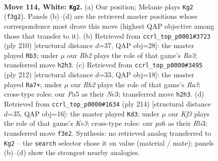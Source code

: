 \documentclass[11pt]{article}
\begin{document}
\clearpage

\begin{figure}[p]\centering
\begin{subfigure}{0.46\textwidth}\centering
\resizebox{\linewidth}{!}{%
\newchessgame
\chessboard[
  setfen={8/k7/p5r1/P1p2p1p/1p3P1P/1P2PKP1/7R/8 w - - 15 114},
  showmover=false,
  pgfstyle=straightmove, color=movearrow, markmove={f3-g2}
]}
\caption{}
\end{subfigure}\hfill
\begin{subfigure}{0.46\textwidth}\centering
\resizebox{\linewidth}{!}{%
\newchessgame
\chessboard[
  setfen={8/5pk1/4p3/4Pp1p/5P1P/R5PK/4r3/8 w - - 95 106},
  showmover=false,
  pgfstyle=straightmove, color=movearrow, markmove={a3-b3}
]}
\caption{}
\end{subfigure}
\\[4pt]
\begin{subfigure}{0.46\textwidth}\centering
\resizebox{\linewidth}{!}{%
\newchessgame
\chessboard[
  setfen={8/4k3/3pp3/2p1p1bp/2P1P3/R1NP1KP1/1r3P2/8 w - - 8 107},
  showmover=false,
  pgfstyle=straightmove, color=movearrow, markmove={a3-a7}
]}
\caption{}
\end{subfigure}\hfill
\begin{subfigure}{0.46\textwidth}\centering
\resizebox{\linewidth}{!}{%
\newchessgame
\chessboard[
  setfen={8/2p5/3p2pk/3Pp1p1/2P1P3/1R2KP1P/2r5/8 w - - 33 108},
  showmover=false,
  pgfstyle=straightmove, color=movearrow, markmove={e3-d3}
]}
\caption{}
\end{subfigure}
\caption{\textbf{Move 114, White: \texttt{Kg2}.} (a) Our position; Melanie plays \texttt{Kg2} (\texttt{f3g2}). Panels (b)--(d) are the retrieved master positions whose correspondence most drove this move (highest QAP objective among those that transfer to it). (b) Retrieved from \texttt{ccrl\_top\_p0001\#3723} (ply 210) [structural distance $d$=37, QAP obj=28]: the master played \texttt{Rb3}; under $\mu$ our \emph{Rh2} plays the role of that game's \emph{Ra3}; transferred move \texttt{h2h3}. (c) Retrieved from \texttt{ccrl\_top\_p0000\#3495} (ply 212) [structural distance $d$=33, QAP obj=18]: the master played \texttt{Ra7+}; under $\mu$ our \emph{Rh2} plays the role of that game's \emph{Ra3}; cross-type roles: our \emph{P}a5 as their \emph{N}c3; transferred move \texttt{h2h3}. (d) Retrieved from \texttt{ccrl\_top\_p0000\#1634} (ply 214) [structural distance $d$=35, QAP obj=16]: the master played \texttt{Kd3}; under $\mu$ our \emph{Kf3} plays the role of that game's \emph{Ke3}; cross-type roles: our \emph{p}a6 as their \emph{R}b3; transferred move \texttt{f3e2}. Synthesis: no retrieved analog transferred to \texttt{Kg2} -- the \texttt{search} selector chose it on value (material / mate); panels (b)--(d) show the strongest nearby analogies.}
\label{fig:thought-m226}
\end{figure}
\end{document}
